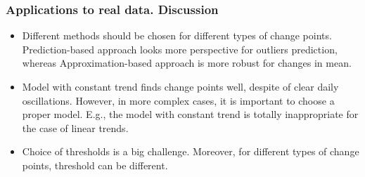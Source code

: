 \documentclass[intlimits, 9pt, unicode]{beamer}
\begin{document}
\begin{frame}
    \frametitle{Applications to real data. Discussion}


\begin{itemize}
	\item Different methods should be chosen for different types of change points. Prediction-based approach looks more perspective for outliers prediction, whereas Approximation-based approach is more robust for changes in mean. 
\bigskip
	\item Model with constant trend finds change points well, despite of clear daily oscillations. However, in more complex cases, it is important to choose a proper model. E.g., the model with constant trend is totally inappropriate for the case of linear trends.
\bigskip
	\item Choice of thresholds is a big challenge. Moreover, for different types of change points,
threshold can be different. 
\end{itemize}

\end{frame}
\end{document}
